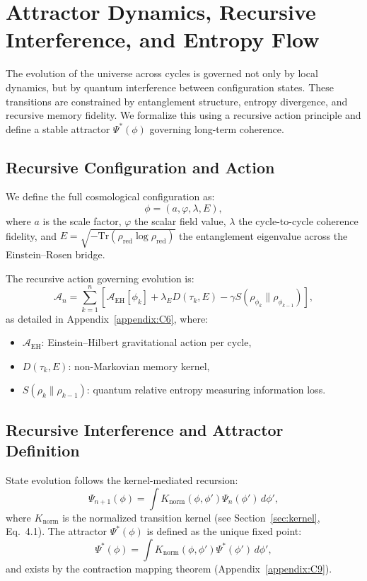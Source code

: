 \section{Attractor Dynamics, Recursive Interference, and Entropy Flow}
\label{sec:recursive-variational}

The evolution of the universe across cycles is governed not only by local dynamics, but by quantum interference between configuration states. These transitions are constrained by entanglement structure, entropy divergence, and recursive memory fidelity. We formalize this using a recursive action principle and define a stable attractor \( \Psi^*(\phi) \) governing long-term coherence.

\subsection{Recursive Configuration and Action}
\label{subsec:recursive-action}

We define the full cosmological configuration as:
\[
\phi = (a, \varphi, \lambda, E),
\]
where \( a \) is the scale factor, \( \varphi \) the scalar field value, \( \lambda \) the cycle-to-cycle coherence fidelity, and \( E = \sqrt{-\mathrm{Tr}(\rho_{\text{red}} \log \rho_{\text{red}})} \) the entanglement eigenvalue across the Einstein--Rosen bridge.

The recursive action governing evolution is:
\begin{equation}
\mathcal{A}_n = \sum_{k=1}^n \left[ \mathcal{A}_{\text{EH}}[\phi_k] + \lambda_E D(\tau_k, E) - \gamma S(\rho_{\phi_k} \| \rho_{\phi_{k-1}}) \right],
\end{equation}
as detailed in Appendix~\ref{appendix:C6}, where:
\begin{itemize}
    \item \( \mathcal{A}_{\text{EH}} \): Einstein–Hilbert gravitational action per cycle,
    \item \( D(\tau_k, E) \): non-Markovian memory kernel,
    \item \( S(\rho_k \| \rho_{k-1}) \): quantum relative entropy measuring information loss.
\end{itemize}

\subsection{Recursive Interference and Attractor Definition}
\label{subsec:attractor}

State evolution follows the kernel-mediated recursion:
\[
\Psi_{n+1}(\phi) = \int K_{\text{norm}}(\phi, \phi') \Psi_n(\phi') \, d\phi',
\]
where \( K_{\text{norm}} \) is the normalized transition kernel (see Section~\ref{sec:kernel}, Eq.~4.1). The attractor \( \Psi^*(\phi) \) is defined as the unique fixed point:
\[
\Psi^*(\phi) = \int K_{\text{norm}}(\phi, \phi') \Psi^*(\phi') \, d\phi',
\]
and exists by the contraction mapping theorem (Appendix~\ref{appendix:C9}).

